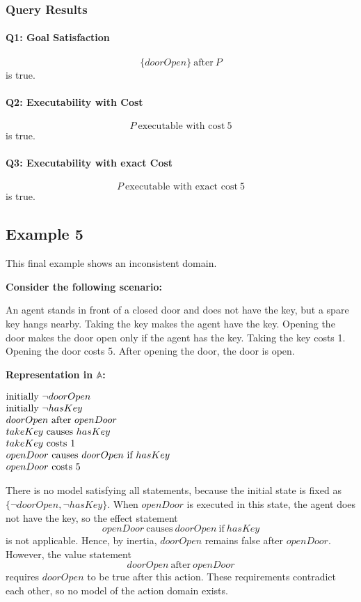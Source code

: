 \documentclass[11pt]{article}
\makeatletter
\newcommand{\scenarioheader}{\par\noindent\textbf{Consider the following scenario:}\par}
\newcommand{\repheader}{\par\noindent\textbf{Representation in \(\mathbb{A}\):}\par}
\newenvironment{centeredleftblock}[1][0.78\textwidth]
{\begin{center}\begin{minipage}{#1}\raggedright}
{\end{minipage}\end{center}}
\newenvironment{statementblock}
{\begin{flushleft}\renewcommand{\arraystretch}{1.1}\(\begin{array}{@{}l@{}}}
{\end{array}\)\end{flushleft}}
\makeatother
\begin{document}
\subsubsection*{Query Results}

\paragraph{Q1: Goal Satisfaction}
\[
\{doorOpen\} ~\text{after}~ P
\]
is true.

\paragraph{Q2: Executability with Cost}
\[
P ~\text{executable with cost}~ 5
\]
is true.

\paragraph{Q3: Executability with exact Cost}
\[
P ~\text{executable with exact cost}~ 5
\]
is true.

\subsection*{Example 5}
This final example shows an inconsistent domain.
\scenarioheader
An agent stands in front of a closed door and does not have the key, but a
spare key hangs nearby. Taking the key makes the agent have the key. Opening
the door makes the door open only if the agent has the key. Taking the key
costs 1. Opening the door costs 5. After opening the door, the door is open.

\repheader
\begin{centeredleftblock}[0.62\textwidth]
\begin{statementblock}
\text{initially}~ \neg doorOpen \\
\text{initially}~ \neg hasKey \\
doorOpen ~\text{after}~ openDoor \\
takeKey ~\text{causes}~ hasKey \\
takeKey ~\text{costs}~ 1 \\
openDoor ~\text{causes}~ doorOpen ~\text{if}~ hasKey \\
openDoor ~\text{costs}~ 5
\end{statementblock}
\end{centeredleftblock}
There is no model satisfying all statements, because the initial state is fixed as
\(\{\neg doorOpen, \neg hasKey\}\). When \(openDoor\) is executed in this state,
the agent does not have the key, so the effect statement
\[
openDoor ~\text{causes}~ doorOpen ~\text{if}~ hasKey
\]
is not applicable. Hence, by inertia, \(doorOpen\) remains false after \(openDoor\).
However, the value statement
\[
doorOpen ~\text{after}~ openDoor
\]
requires \(doorOpen\) to be true after this action. These requirements contradict
each other, so no model of the action domain exists.
\end{document}
